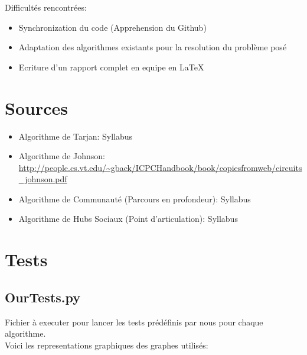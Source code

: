 \documentclass[12pt, oneside]{article}
\begin{document}
Difficultés rencontrées:
\begin{itemize}
\item Synchronization du code (Apprehension du Github)
\item Adaptation des algorithmes existants pour la resolution du problème posé
\item Ecriture d'un rapport complet en equipe en LaTeX
\end{itemize}
\section{Sources}
\begin{itemize}
\item Algorithme de Tarjan: Syllabus
\item Algorithme de Johnson: \url{http://people.cs.vt.edu/~gback/ICPCHandbook/book/copiesfromweb/circuits\_johnson.pdf}
\item Algorithme de Communauté (Parcours en profondeur): Syllabus
\item Algorithme de Hubs Sociaux (Point d'articulation): Syllabus
\end{itemize}

\section{Tests}
\subsection{OurTests.py}
Fichier à executer pour lancer les tests prédéfinis par nous pour chaque algorithme.\\
Voici les representations graphiques des graphes utilisés:
\end{document}
